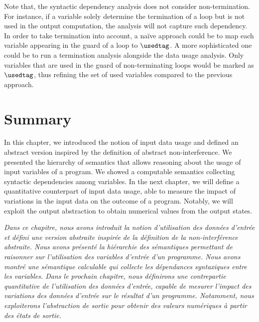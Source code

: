 Note that, the syntactic dependency analysis does not consider non-termination. For instance, if a variable solely determine the termination of a loop but is not used in the output computation, the analysis will not capture such dependency.
In order to take termination into account, a na\"ive approach could be to map each variable appearing in the guard of a loop to $\usedtag$. A more sophisticated one could be to run a termination analysis alongside the data usage analysis.
Only variables that are used in the guard of non-terminating loops would be marked as $\usedtag$, thus refining the set of used variables compared to the previous approach.

\section{Summary}

In this chapter, we introduced the notion of input data usage and defined an abstract version inspired by the definition of abstract non-interference.
We presented the hierarchy of semantics that allows reasoning about the usage of input variables of a program.
We showed a computable semantics collecting syntactic dependencies among variables.
In the next chapter, we will define a quantitative counterpart of input data usage, able to measure the impact of variations in the input data on the outcome of a program.
Notably, we will exploit the output abstraction to obtain numerical values from the output states.

\frenchdiv

\emph{Dans ce chapitre, nous avons introduit la notion d'utilisation des données d'entrée et défini une version abstraite inspirée de la définition de la non-interférence abstraite. Nous avons présenté la hiérarchie des sémantiques permettant de raisonner sur l'utilisation des variables d'entrée d'un programme. Nous avons montré une sémantique calculable qui collecte les dépendances syntaxiques entre les variables. Dans le prochain chapitre, nous définirons une contrepartie quantitative de l'utilisation des données d'entrée, capable de mesurer l'impact des variations des données d'entrée sur le résultat d'un programme. Notamment, nous exploiterons l'abstraction de sortie pour obtenir des valeurs numériques à partir des états de sortie.}
